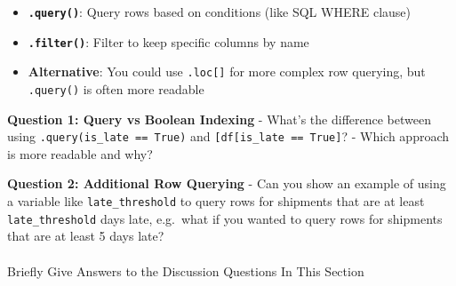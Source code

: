 \documentclass[
  letterpaper,
  DIV=11,
  numbers=noendperiod]{scrartcl}
\makeatletter
\let\oldparagraph\paragraph
\renewcommand{\paragraph}{
    \@ifstar
      \xxxParagraphStar
      \xxxParagraphNoStar
  }
\newcommand{\xxxParagraphStar}[1]{\oldparagraph*{#1}\mbox{}}
\newcommand{\xxxParagraphNoStar}[1]{\oldparagraph{#1}\mbox{}}
\providecommand{\tightlist}{%
  \setlength{\itemsep}{0pt}\setlength{\parskip}{0pt}}
\makeatother
\begin{document}
\begin{tcolorbox}[enhanced jigsaw, toptitle=1mm, opacityback=0, colframe=quarto-callout-note-color-frame, leftrule=.75mm, arc=.35mm, opacitybacktitle=0.6, breakable, titlerule=0mm, coltitle=black, bottomtitle=1mm, title=\textcolor{quarto-callout-note-color}{\faInfo}\hspace{0.5em}{🔍 Understanding the Methods}, colbacktitle=quarto-callout-note-color!10!white, rightrule=.15mm, left=2mm, bottomrule=.15mm, toprule=.15mm, colback=white]

\begin{itemize}
\tightlist
\item
  \textbf{\texttt{.query()}}: Query rows based on conditions (like SQL
  WHERE clause)
\item
  \textbf{\texttt{.filter()}}: Filter to keep specific columns by name
\item
  \textbf{Alternative}: You could use \texttt{.loc{[}{]}} for more
  complex row querying, but \texttt{.query()} is often more readable
\end{itemize}

\end{tcolorbox}

\begin{tcolorbox}[enhanced jigsaw, toptitle=1mm, opacityback=0, colframe=quarto-callout-important-color-frame, leftrule=.75mm, arc=.35mm, opacitybacktitle=0.6, breakable, titlerule=0mm, coltitle=black, bottomtitle=1mm, title=\textcolor{quarto-callout-important-color}{\faExclamation}\hspace{0.5em}{🤔 Discussion Questions: Subset Mental Model}, colbacktitle=quarto-callout-important-color!10!white, rightrule=.15mm, left=2mm, bottomrule=.15mm, toprule=.15mm, colback=white]

\textbf{Question 1: Query vs Boolean Indexing} - What's the difference
between using
\texttt{.query(\textquotesingle{}is\_late\ ==\ True\textquotesingle{})}
and
\texttt{{[}df{[}\textquotesingle{}is\_late\textquotesingle{}{]}\ ==\ True{]}}?
- Which approach is more readable and why?

\textbf{Question 2: Additional Row Querying} - Can you show an example
of using a variable like \texttt{late\_threshold} to query rows for
shipments that are at least \texttt{late\_threshold} days late,
e.g.~what if you wanted to query rows for shipments that are at least 5
days late?

\end{tcolorbox}

\paragraph{Briefly Give Answers to the Discussion Questions In This
Section}\label{briefly-give-answers-to-the-discussion-questions-in-this-section-1}
\end{document}
